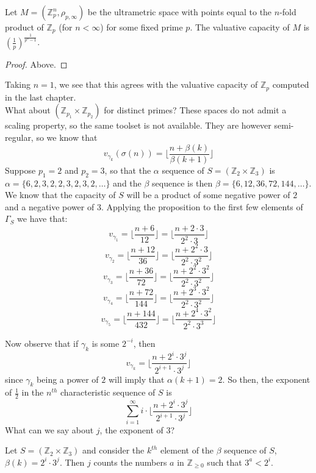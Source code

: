 \begin{proposition*}
Let $M=(\mathbb{Z}_p^n, \rho_{p, \infty})$ be the ultrametric space with points equal to the $n$-fold product of $\mathbb{Z}_p$ (for $n < \infty$) for some fixed prime $p$. The valuative capacity of $M$ is  $(\frac{1}{p})^{\frac{1}{p^n-1}}$.
\end{proposition*}

\begin{proof}
Above.
\end{proof}

Taking $n=1$, we see that this agrees with the valuative capacity of $\mathbb{Z}_p$ computed in the last chapter. \\

What about $(\mathbb{Z}_{p_1} \times \mathbb{Z}_{p_2})$ for distinct primes? These spaces do not admit a scaling property, so the same toolset is not available. They are however semi-regular, so we know that  \[v_{\gamma_k}(\sigma(n)) = \lfloor\frac{n +\beta(k)}{\beta(k+1)}\rfloor\]
Suppose $p_1 =2$ and $p_2 =3$, so that the $\alpha$ sequence of $S = (\mathbb{Z}_{2} \times \mathbb{Z}_{3})$ is $\alpha = \{6,2,3,2,2,3,2,3,2,\ldots\}$ and the $\beta$ sequence is then $\beta = \{6,12,36,72,144,\ldots\}$. We know that the capacity of $S$ will be a product of some negative power of $2$ and a negative power of $3$. Applying the proposition to the first few elements of $\Gamma_S$ we have that:
\[v_{\gamma_1} = \lfloor \frac{n +6 }{12} \rfloor =\lfloor \frac{n + 2\cdot 3 }{2^2 \cdot 3} \rfloor \]
\[v_{\gamma_2} = \lfloor \frac{n +12 }{36} \rfloor =\lfloor \frac{n + 2^2\cdot 3 }{2^2 \cdot 3^2} \rfloor \]
\[v_{\gamma_3} = \lfloor \frac{n +36 }{72} \rfloor =\lfloor \frac{n + 2^2\cdot 3^2 }{2^2 \cdot 3^2} \rfloor \]
\[v_{\gamma_4} = \lfloor \frac{n +72 }{144} \rfloor =\lfloor \frac{n + 2^3\cdot 3^2 }{2^2 \cdot 3^2} \rfloor \]
\[v_{\gamma_5} = \lfloor \frac{n +144 }{432} \rfloor =\lfloor \frac{n + 2^4\cdot 3 ^2}{2^2 \cdot 3^3} \rfloor \]

Now observe that if $\gamma_k$ is some $2^{-i}$, then \[v_{\gamma_k} =\lfloor \frac{n + 2^i\cdot 3 ^j}{2^{i+1} \cdot 3^j} \rfloor \] since $\gamma_k$ being a power of $2$ will imply that $\alpha(k+1)=2$. So then, the exponent of $\frac{1}{2}$ in the $n^{th}$ characteristic sequence of $S$ is \[ \sum_{i=1}^\infty i \cdot \lfloor\frac{n + 2^i \cdot 3^j}{2^{i+1}\cdot 3^j} \rfloor\] What can we say about $j$, the exponent of $3$? 

\begin{lemma*}
Let $S = (\mathbb{Z}_{2} \times \mathbb{Z}_{3}) $ and consider the $k^{th}$ element of the $\beta$ sequence of $S$, $\beta(k) = 2^i \cdot 3^j$. Then $j$ counts the numbers $a$ in $\mathbb{Z}_{\geq 0}$ such that $3^a < 2^i$.
\end{lemma*}

